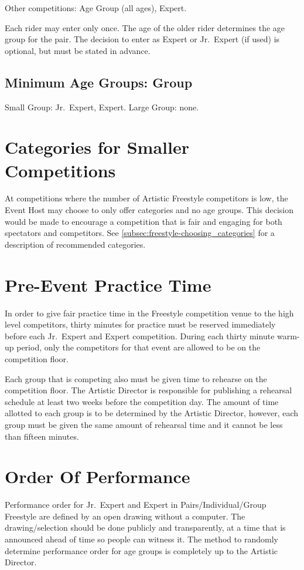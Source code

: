 Other competitions: Age Group (all ages), Expert.

Each rider may enter only once.
The age of the older rider determines the age group for the pair.
The decision to enter as Expert or Jr.~Expert (if used) is optional, but must be stated in advance.

\subsection{Minimum Age Groups: Group}

Small Group: Jr.~Expert, Expert.
Large Group: none.

\section{Categories for Smaller Competitions}
At competitions where the number of Artistic Freestyle competitors is low, the Event Host may choose to only offer categories and no age groups.
This decision would be made to encourage a competition that is fair and engaging for both spectators and competitors.
See \ref{subsec:freestyle-choosing_categories} for a description of recommended categories.


\section{Pre-Event Practice Time}
In order to give fair practice time in the Freestyle competition venue to the high level competitors, thirty minutes for practice must be reserved immediately before each Jr.~Expert and Expert competition.
During each thirty minute warm-up period, only the competitors for that event are allowed to be on the competition floor.

Each group that is competing also must be given time to rehearse on the competition floor.
The Artistic Director is responsible for publishing a rehearsal schedule at least two weeks before the competition day.
The amount of time allotted to each group is to be determined by the Artistic Director, however, each group must be given the same amount of rehearsal time and it cannot be less than fifteen minutes.

\section{Order Of Performance}
Performance order for Jr.~Expert and Expert in Pairs/Individual/Group Freestyle are defined by an open drawing without a computer.%
The drawing/selection should be done publicly and transparently, at a time that is announced ahead of time so people can witness it.
The method to randomly determine performance order for age groups is completely up to the Artistic Director.

